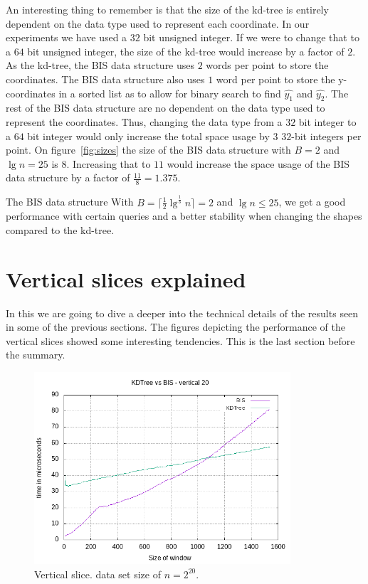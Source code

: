 An interesting thing to remember is that the size of the kd-tree is entirely dependent on the data type used to represent each coordinate. In our experiments we have used a $32$ bit unsigned integer. If we were to change that to a $64$ bit unsigned integer, the size of the kd-tree would increase by a factor of $2$. As the kd-tree, the BIS data structure uses $2$ words per point to store the coordinates. The BIS data structure also uses $1$ word per point to store the y-coordinates in a sorted list as to allow for binary search to find $\hat{y_1}$ and $\hat{y_2}$. The rest of the BIS data structure are no dependent on the data type used to represent the coordinates. Thus, changing the data type from a $32$ bit integer to a $64$ bit integer would only increase the total space usage by $3$ $32$-bit integers per point. On figure~\ref{fig:sizes} the size of the BIS data structure with $B=2$ and $\lg n = 25$ is $8$. Increasing that to $11$ would increase the space usage of the BIS data structure by a factor of $\frac{11}{8} = 1.375$.

The BIS data structure With $B = \lceil \frac{1}{2}\lg^{\frac{1}{3}} n \rceil = 2$ and $\lg n \leq 25$, we get a good performance with certain queries and a better stability when changing the shapes compared to the kd-tree. 


\section{Vertical slices explained}
\label{sect:verthoriexp}

In this we are going to dive a deeper into the technical details of the results seen in some of the previous sections. The figures depicting the performance of the vertical slices showed some interesting tendencies. This is the last section before the summary.

\begin{figure}[h]
    \centering
    \includegraphics[width = 0.85\textwidth]{pictures/analysis/vert_20.png}
    \caption{Vertical slice. data set size of $n=2^{20}$.}\label{fig:vert_20}
\end{figure}


